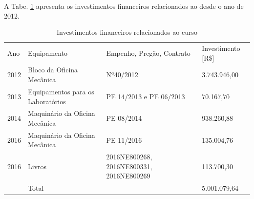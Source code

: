 A Tabe. \ref{tab10} apresenta os investimentos financeiros relacionados ao \NOMECURSO desde o ano de 2012. 

\begin{longtable}{|p{1.0cm}|p{6.0cm}|p{3.0cm}|p{3.0cm}|}
	
	\caption{Investimentos financeiros relacionados ao curso}\label{tab10} 
	\vspace{-0.25cm}
	
	\\ \hline 
	\cellcolor{\cinza}Ano & \cellcolor{\cinza}Equipamento & \cellcolor{\cinza}Empenho, Pregão, Contrato & \cellcolor{\cinza}Investimento [R\$]  \\ 
	\hline
	2012 &  Bloco da Oficina Mecânica & Nº40/2012  &  3.743.946,00 \\ \hline
	2013 &  Equipamentos para os Laboratórios  & PE 14/2013 e PE 06/2013 &  70.167,70 \\ \hline
	2014 &  Maquinário da Oficina Mecânica & PE 08/2014 &  938.260,88 \\ \hline
	2016 &  Maquinário da Oficina Mecânica  & PE 11/2016 & 135.004,76 \\ \hline
	2016 &  Livros & 2016NE800268, 2016NE800331, 2016NE800269 &  113.700,30 \\ \hline
	&  Total & & 5.001.079,64 \\ \hline
\end{longtable}

